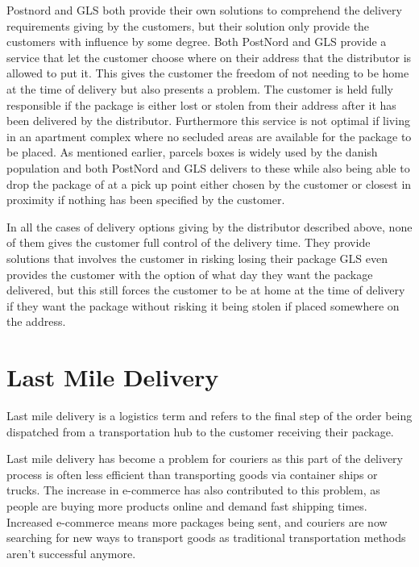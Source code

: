 \documentclass[12pt]{report}
\begin{document}
Postnord and GLS both provide their own solutions to comprehend the delivery requirements giving by the customers, but their solution only provide the customers with influence by some degree. Both PostNord and GLS provide a service that let the customer choose where on their address that the distributor is allowed to put it. This gives the customer the freedom of not needing to be home at the time of delivery but also presents a problem. The customer is held fully responsible if the package is either lost or stolen from their address after it has been delivered by the distributor\cite{postnordoptions}\cite{glsoptions}. Furthermore this service is not optimal if living in an apartment complex where no secluded areas are available for the package to be placed. As mentioned earlier, parcels boxes is widely used by the danish population and both PostNord and GLS delivers to these while also being able to drop the package of at a pick up point either chosen by the customer or closest in proximity if nothing has been specified by the customer\cite{postnordoptions}\cite{glsoptions}.

In all the cases of delivery options giving by the distributor described above, none of them gives the customer full control of the delivery time. They provide solutions that involves the customer in risking losing their package\cite{Pakketyveri} GLS even provides the customer with the option of what day they want the package delivered, but this still forces the customer to be at home at the time of delivery if they want the package without risking it being stolen if placed somewhere on the address\cite{Pakketyveri}.



\section{Last Mile Delivery}
Last mile delivery is a logistics term and refers to the final step of the order being dispatched from a transportation hub to the customer receiving their package.

Last mile delivery has become a problem for couriers as this part of the delivery process is often less efficient than transporting goods via container ships or trucks. The increase in e-commerce has also contributed to this problem, as people are buying more products online and demand fast shipping times. Increased e-commerce means more packages being sent, and couriers are now searching for new ways to transport goods as traditional transportation methods aren't successful anymore. \\\hspace*{5 mm}
\end{document}
